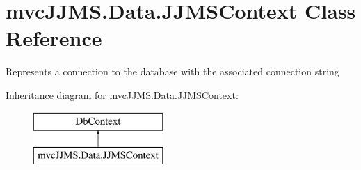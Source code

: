 \hypertarget{classmvc_j_j_m_s_1_1_data_1_1_j_j_m_s_context}{}\section{mvc\+J\+J\+M\+S.\+Data.\+J\+J\+M\+S\+Context Class Reference}
\label{classmvc_j_j_m_s_1_1_data_1_1_j_j_m_s_context}


Represents a connection to the database with the associated connection string  


Inheritance diagram for mvc\+J\+J\+M\+S.\+Data.\+J\+J\+M\+S\+Context\+:\begin{figure}[H]
\begin{center}
\leavevmode
\includegraphics[height=2.000000cm]{classmvc_j_j_m_s_1_1_data_1_1_j_j_m_s_context}
\end{center}
\end{figure}
